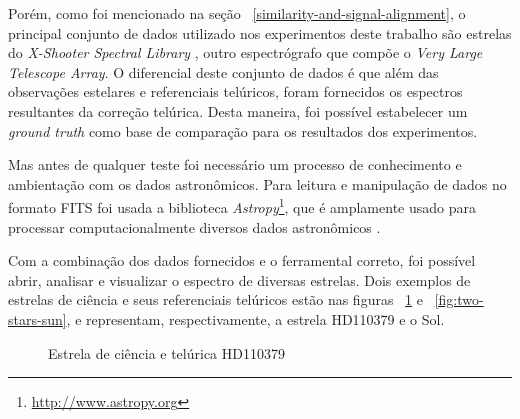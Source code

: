 Porém, como foi mencionado na seção ~\ref{similarity-and-signal-alignment}, o principal conjunto de dados utilizado nos experimentos deste trabalho são estrelas do \textit{X-Shooter Spectral Library} \citep{Chen2014TheXS}, outro espectrógrafo que compõe o \textit{Very Large Telescope Array}. O diferencial deste conjunto de dados é que além das observações estelares e referenciais telúricos, foram fornecidos os espectros resultantes da correção telúrica. Desta maneira, foi possível estabelecer um \textit{ground truth} como base de comparação para os resultados dos experimentos.

Mas antes de qualquer teste foi necessário um processo de conhecimento e ambientação com os dados astronômicos. Para leitura e manipulação de dados no formato FITS foi usada a biblioteca \textit{Astropy}\footnote{\url{http://www.astropy.org}}, que é amplamente usado para processar computacionalmente diversos dados astronômicos \citep{astropy:2018}. 

Com a combinação dos dados fornecidos e o ferramental correto, foi possível abrir, analisar e visualizar o espectro de diversas estrelas. Dois exemplos de estrelas de ciência e seus referenciais telúricos estão nas figuras ~\ref{fig:two-stars-hd110379} e ~\ref{fig:two-stars-sun}, e representam, respectivamente, a estrela HD110379 e o Sol.

\begin{figure}[htb]
  \centering
  \hfill
  \caption{Estrela de ciência e telúrica HD110379}
  \label{fig:two-stars-hd110379}
\end{figure}

